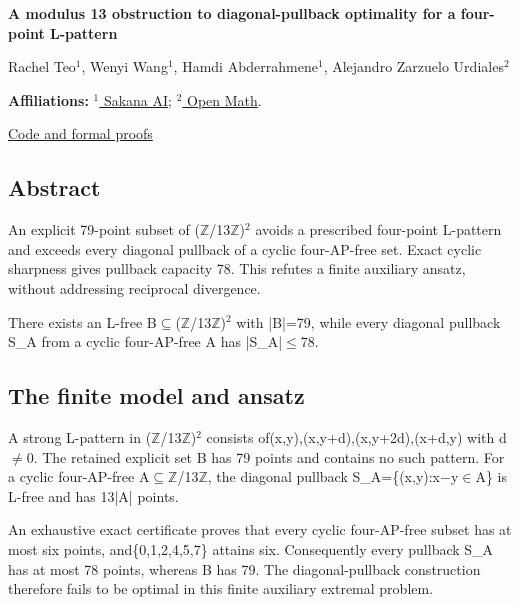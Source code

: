 \documentclass[11pt,a4paper]{article}
\begin{document}
{\LARGE\bfseries A modulus 13 obstruction to diagonal-pullback optimality for a four-point L-pattern\par}\medskip
{\small Rachel Teo\ensuremath{^1}, Wenyi Wang\ensuremath{^1}, Hamdi Abderrahmene\ensuremath{^1}, Alejandro Zarzuelo Urdiales\ensuremath{^2}\par}\medskip
{\small\textbf{Affiliations:} \href{https://sakana.ai/}{\ensuremath{^1} Sakana AI}; \href{https://rsihouse.ai/openmath}{\ensuremath{^2} Open Math}.\par}

{\small\href{https://github.com/alejandrozu/openmath-2026-judging}{Code and formal proofs}\par}

\subsection{Abstract}
An explicit 79-point subset of (\ensuremath{\mathbb{Z}}/13\ensuremath{\mathbb{Z}})\ensuremath{^2} avoids a prescribed four-point L-pattern and exceeds every diagonal pullback of a cyclic four-AP-free set. Exact cyclic sharpness gives pullback capacity 78. This refutes a finite auxiliary ansatz, without addressing reciprocal divergence.

There exists an L-free B\ensuremath{\subseteq}(\ensuremath{\mathbb{Z}}/13\ensuremath{\mathbb{Z}})\ensuremath{^2} with |B|=79, while every diagonal pullback S\_A from a cyclic four-AP-free A has |S\_A|\ensuremath{\leq}78.

\subsection{The finite model and ansatz}
A strong L-pattern in (\ensuremath{\mathbb{Z}}/13\ensuremath{\mathbb{Z}})\ensuremath{^2} consists of(x,y),(x,y+d),(x,y+2d),(x+d,y) with d\ensuremath{\neq}0. The retained explicit set B has 79 points and contains no such pattern. For a cyclic four-AP-free A\ensuremath{\subseteq}\ensuremath{\mathbb{Z}}/13\ensuremath{\mathbb{Z}}, the diagonal pullback S\_A=\{(x,y):x\ensuremath{-}y\ensuremath{\in}A\} is L-free and has 13|A| points.

An exhaustive exact certificate proves that every cyclic four-AP-free subset has at most six points, and\{0,1,2,4,5,7\} attains six. Consequently every pullback S\_A has at most 78 points, whereas B has 79. The diagonal-pullback construction therefore fails to be optimal in this finite auxiliary extremal problem.
\end{document}
